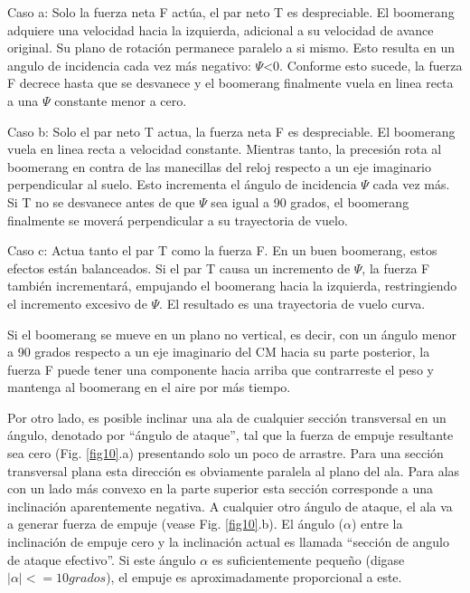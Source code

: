 	Caso a: Solo la fuerza neta F actúa, el par neto T es despreciable. El boomerang adquiere una velocidad hacia la izquierda, adicional a su velocidad de avance original. Su plano de rotación permanece paralelo a si mismo. Esto resulta en un angulo de incidencia cada vez más negativo: $\Psi$<0. Conforme esto sucede, la fuerza F decrece hasta que se desvanece y el boomerang finalmente vuela en linea recta a una $\Psi$ constante menor a cero.

	Caso b: Solo el par neto T actua, la fuerza neta F es despreciable. El boomerang vuela en linea recta a velocidad constante.  Mientras tanto, la precesión rota al boomerang en contra de las manecillas del reloj respecto a un eje imaginario perpendicular al suelo. Esto incrementa el ángulo de incidencia $\Psi$ cada vez más. Si T no se desvanece antes de que $\Psi$ sea igual a 90 grados, el boomerang finalmente se moverá perpendicular a su trayectoria de vuelo.

	Caso c: Actua tanto el par T como la fuerza F. En un buen boomerang, estos efectos están balanceados. Si el par T causa un incremento de $\Psi$, la fuerza F también incrementará, empujando el boomerang hacia la izquierda, restringiendo el incremento excesivo de $\Psi$. El resultado es una trayectoria de vuelo curva.

	Si el boomerang se mueve en un plano no vertical, es decir, con un ángulo menor a 90 grados respecto a un eje imaginario del CM hacia su parte posterior, la fuerza F puede tener una componente hacia arriba que contrarreste el peso y mantenga al boomerang en el aire por más tiempo.

	Por otro lado, es posible inclinar una ala de cualquier sección transversal en un ángulo, denotado por ``ángulo de ataque'', tal que la fuerza de empuje resultante sea cero (Fig. \ref{fig10}.a) presentando solo un poco de arrastre. Para una sección transversal plana esta dirección es obviamente paralela al plano del ala. Para alas con un lado más convexo en la parte superior esta sección corresponde a una inclinación aparentemente negativa. A cualquier otro ángulo de ataque, el ala va a generar fuerza de empuje (vease Fig. \ref{fig10}.b). El ángulo ($\alpha$) entre la inclinación de empuje cero y la inclinación actual es llamada ``sección de angulo de ataque efectivo''. Si este ángulo $\alpha$ es suficientemente pequeño (digase $|\alpha| <= 10 grados$), el empuje es aproximadamente proporcional a este.

